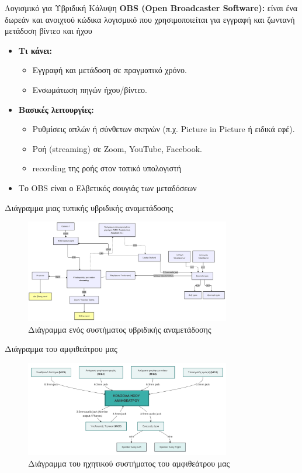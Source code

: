 \documentclass[aspectratio=169]{beamer}
\begin{document}
\begin{frame}{Λογισμικό για Υβριδική Κάλυψη}
  \textbf{OBS (Open Broadcaster Software):}
  είναι ένα δωρεάν και ανοιχτού κώδικα λογισμικό που χρησιμοποιείται για
  εγγραφή και ζωντανή μετάδοση βίντεο και ήχου
  \begin{itemize}
    \item \textbf{Τι κάνει:}
          \begin{itemize}
            \item Εγγραφή και μετάδοση σε πραγματικό χρόνο.
            \item Ενσωμάτωση πηγών ήχου/βίντεο.
          \end{itemize}
    \item \textbf{Βασικές λειτουργίες:}
          \begin{itemize}
            \item Ρυθμίσεις απλών ή σύνθετων σκηνών (π.χ. Picture in Picture ή ειδικά εφέ).
            \item Ροή (streaming) σε Zoom, YouTube, Facebook.
            \item recording της ροής στον τοπικό υπολογιστή
          \end{itemize}
    \item Το OBS είναι ο Ελβετικός σουγιάς των μεταδόσεων
  \end{itemize}
\end{frame}
\begin{frame}{Διάγραμμα μιας τυπικής υβριδικής αναμετάδοσης}
  \begin{figure}
    \centering
    \includegraphics[width=0.8\textwidth]{images/diagram.png}
    \caption{Διάγραμμα ενός συστήματος υβριδικής αναμετάδοσης}
  \end{figure}
\end{frame}
\begin{frame}{Διάγραμμα του αμφιθεάτρου μας}
  \begin{figure}
    \centering
    \includegraphics[width=0.8\textwidth]{images/amfitheatro.pdf}
    \caption{Διάγραμμα του ηχητικού συστήματος του αμφιθεάτρου μας}
  \end{figure}
\end{frame}
\end{document}
